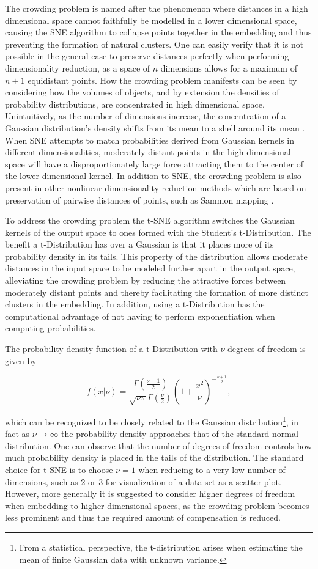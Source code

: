 The crowding problem is named after the phenomenon where distances in a high dimensional space cannot faithfully be modelled in a lower dimensional space, causing the SNE algorithm to collapse points together in the embedding and thus preventing the formation of natural clusters. One can easily verify that it is not possible in the general case to preserve distances perfectly when performing dimensionality reduction, as a space of $n$ dimensions allows for a maximum of $n+1$ equidistant points. How the crowding problem manifests can be seen by considering how the volumes of objects, and by extension the densities of probability distributions, are concentrated in high dimensional space. Unintuitively, as the number of dimensions increase, the concentration of a Gaussian distribution's density shifts from its mean to a shell around its mean \cite[p.~50]{high_dimensional_probability}. When SNE attempts to match probabilities derived from Gaussian kernels in different dimensionalities, moderately distant points in the high dimensional space will have a disproportionately large force attracting them to the center of the lower dimensional kernel. In addition to SNE, the crowding problem is also present in other nonlinear dimensionality reduction methods which are based on preservation of pairwise distances of points, such as Sammon mapping \cite{tsne}.

To address the crowding problem the t-SNE algorithm switches the Gaussian kernels of the output space to ones formed with the Student's t-Distribution. The benefit a t-Distribution has over a Gaussian is that it places more of its probability density in its tails. This property of the distribution allows moderate distances in the input space to be modeled further apart in the output space, alleviating the crowding problem by reducing the attractive forces between moderately distant points and thereby facilitating the formation of more distinct clusters in the embedding. In addition, using a t-Distribution has the computational advantage of not having to perform exponentiation when computing probabilities.

The probability density function of a t-Distribution with $\nu$ degrees of freedom is given by

$$f(x \vert \nu) = \frac{\Gamma(\frac{\nu + 1}{2})}{\sqrt{\nu \pi} \Gamma(\frac{\nu}{2})} (1 + \frac{x^2}{\nu})^{-\frac{\nu + 1}{2}},$$

which can be recognized to be closely related to the Gaussian distribution\footnote{From a statistical perspective, the t-distribution arises when estimating the mean of finite Gaussian data with unknown variance.}, in fact as $\nu \rightarrow \infty$ the probability density approaches that of the standard normal distribution. One can observe that the number of degrees of freedom controls how much probability density is placed in the tails of the distribution. The standard choice for t-SNE is to choose $\nu = 1$ when reducing to a very low number of dimensions, such as 2 or 3 for visualization of a data set as a scatter plot. However, more generally it is suggested to consider higher degrees of freedom when embedding to higher dimensional spaces, as the crowding problem becomes less prominent and thus the required amount of compensation is reduced.

